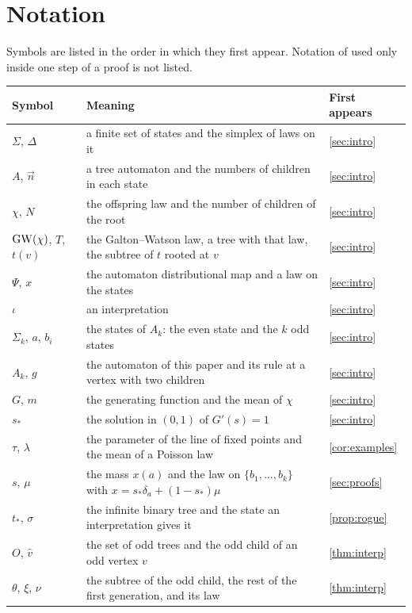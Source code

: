 \section{Notation}\label{app:notation}
Symbols are listed in the order in which they first appear. Notation of \cite{JPS} used only inside one step of a proof is not listed.

\medskip
\begin{center}
\small
\begin{tabular}{@{}lp{}l@{}}
\toprule
Symbol & Meaning & First appears\\
\midrule
$\Sigma$, $\Delta$ & a finite set of states and the simplex of laws on it & \cref{sec:intro}\\
$A$, $\vec n$ & a tree automaton and the numbers of children in each state & \cref{sec:intro}\\
$\chi$, $N$ & the offspring law and the number of children of the root & \cref{sec:intro}\\
$\mathrm{GW}(\chi)$, $T$, $t(v)$ & the Galton--Watson law, a tree with that law, the subtree of $t$ rooted at $v$ & \cref{sec:intro}\\
$\Psi$, $x$ & the automaton distributional map and a law on the states & \cref{sec:intro}\\
$\iota$ & an interpretation & \cref{sec:intro}\\
$\Sigma_k$, $a$, $b_i$ & the states of $A_k$: the even state and the $k$ odd states & \cref{sec:intro}\\
$A_k$, $g$ & the automaton of this paper and its rule at a vertex with two children & \cref{sec:intro}\\
$G$, $m$ & the generating function and the mean of $\chi$ & \cref{sec:intro}\\
$s_*$ & the solution in $(0,1)$ of $G'(s)=1$ & \cref{sec:intro}\\
$\tau$, $\lambda$ & the parameter of the line of fixed points and the mean of a Poisson law & \cref{cor:examples}\\
$s$, $\mu$ & the mass $x(a)$ and the law on $\{b_1,\dots,b_k\}$ with $x=s_*\delta_a+(1-s_*)\mu$ & \cref{sec:proofs}\\
$t_*$, $\sigma$ & the infinite binary tree and the state an interpretation gives it & \cref{prop:rogue}\\
$O$, $\hat v$ & the set of odd trees and the odd child of an odd vertex $v$ & \cref{thm:interp}\\
$\theta$, $\xi$, $\nu$ & the subtree of the odd child, the rest of the first generation, and its law & \cref{thm:interp}\\

\end{tabular}
\end{center}
